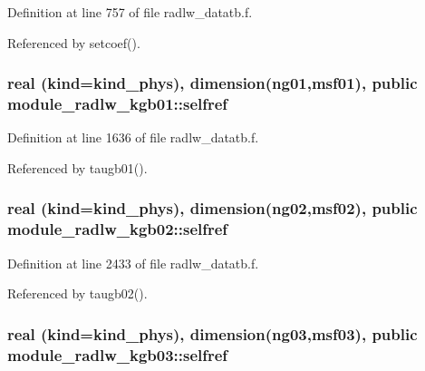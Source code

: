 Definition at line 757 of file radlw\+\_\+datatb.\+f.



Referenced by setcoef().

\subsubsection[{\texorpdfstring{selfref}{selfref}}]{\setlength{\rightskip}{0pt plus 5cm}real (kind=kind\+\_\+phys), dimension(ng01,msf01), public module\+\_\+radlw\+\_\+kgb01\+::selfref}\hypertarget{group__module__radlw__main_ga14c7cc68b26c0ab1fdfda6faa2d485d5}{}\label{group__module__radlw__main_ga14c7cc68b26c0ab1fdfda6faa2d485d5}


Definition at line 1636 of file radlw\+\_\+datatb.\+f.



Referenced by taugb01().

\subsubsection[{\texorpdfstring{selfref}{selfref}}]{\setlength{\rightskip}{0pt plus 5cm}real (kind=kind\+\_\+phys), dimension(ng02,msf02), public module\+\_\+radlw\+\_\+kgb02\+::selfref}\hypertarget{group__module__radlw__main_gaddb071e93b4ff49ba1f1c4d102e275f1}{}\label{group__module__radlw__main_gaddb071e93b4ff49ba1f1c4d102e275f1}


Definition at line 2433 of file radlw\+\_\+datatb.\+f.



Referenced by taugb02().

\subsubsection[{\texorpdfstring{selfref}{selfref}}]{\setlength{\rightskip}{0pt plus 5cm}real (kind=kind\+\_\+phys), dimension(ng03,msf03), public module\+\_\+radlw\+\_\+kgb03\+::selfref}\hypertarget{group__module__radlw__main_ga6bb40d898660e6dfc056d3efe1d0c544}{}\label{group__module__radlw__main_ga6bb40d898660e6dfc056d3efe1d0c544}


